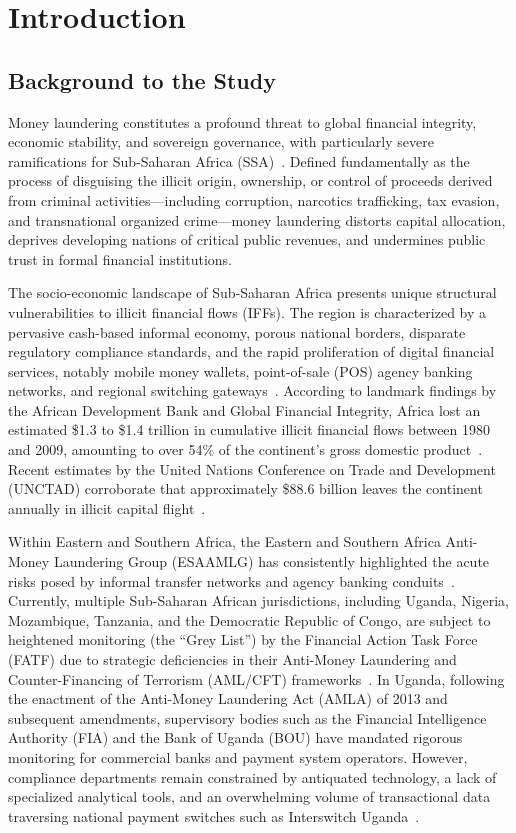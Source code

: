 \chapter{Introduction} \label{ch:intro}

\section{Background to the Study}
Money laundering constitutes a profound threat to global financial integrity, economic stability, and sovereign governance, with particularly severe ramifications for Sub-Saharan Africa (SSA)~\cite{kumar2012money}. Defined fundamentally as the process of disguising the illicit origin, ownership, or control of proceeds derived from criminal activities---including corruption, narcotics trafficking, tax evasion, and transnational organized crime---money laundering distorts capital allocation, deprives developing nations of critical public revenues, and undermines public trust in formal financial institutions.

The socio-economic landscape of Sub-Saharan Africa presents unique structural vulnerabilities to illicit financial flows (IFFs). The region is characterized by a pervasive cash-based informal economy, porous national borders, disparate regulatory compliance standards, and the rapid proliferation of digital financial services, notably mobile money wallets, point-of-sale (POS) agency banking networks, and regional switching gateways~\cite{kar2013illicit, coulibaly2019sub}. According to landmark findings by the African Development Bank and Global Financial Integrity, Africa lost an estimated \$1.3 to \$1.4 trillion in cumulative illicit financial flows between 1980 and 2009, amounting to over 54\% of the continent's gross domestic product~\cite{kar2013illicit}. Recent estimates by the United Nations Conference on Trade and Development (UNCTAD) corroborate that approximately \$88.6 billion leaves the continent annually in illicit capital flight~\cite{unctad-illicit-flows}.

Within Eastern and Southern Africa, the Eastern and Southern Africa Anti-Money Laundering Group (ESAAMLG) has consistently highlighted the acute risks posed by informal transfer networks and agency banking conduits~\cite{issafrica-monograph}. Currently, multiple Sub-Saharan African jurisdictions, including Uganda, Nigeria, Mozambique, Tanzania, and the Democratic Republic of Congo, are subject to heightened monitoring (the ``Grey List'') by the Financial Action Task Force (FATF) due to strategic deficiencies in their Anti-Money Laundering and Counter-Financing of Terrorism (AML/CFT) frameworks~\cite{FATF2023, fatf2023consolidated}. In Uganda, following the enactment of the Anti-Money Laundering Act (AMLA) of 2013 and subsequent amendments, supervisory bodies such as the Financial Intelligence Authority (FIA) and the Bank of Uganda (BOU) have mandated rigorous monitoring for commercial banks and payment system operators. However, compliance departments remain constrained by antiquated technology, a lack of specialized analytical tools, and an overwhelming volume of transactional data traversing national payment switches such as Interswitch Uganda~\cite{kiwanuka2020detecting, ali2020evaluation}.

